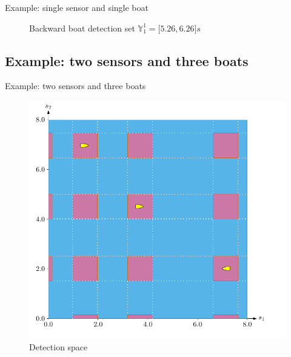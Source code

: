 \documentclass{beamer}
\begin{document}
\begin{frame}{Example: single sensor and single boat}
\begin{minipage}{0.45\textwidth}
\begin{figure}
                            \caption{Backward boat detection set $\mathbb{Y}_1^1 = \lbrack5.26, 6.26\rbrack s$}
                    \end{figure}
                \end{minipage}
            \end{frame}

        \subsection{Example: two sensors and three boats}

            \begin{frame}{Example: two sensors and three boats}
                \begin{minipage}{0.45\textwidth}
                    \begin{figure}
                            \includegraphics[width=\textwidth]{imgs/ex_detection_space}
                            \caption{Detection space}
                    \end{figure}
                \end{minipage}
                \hfill
                \begin{minipage}{0.45\textwidth}
                    \begin{figure}

\end{figure}
\end{minipage}
\end{frame}
\end{document}
